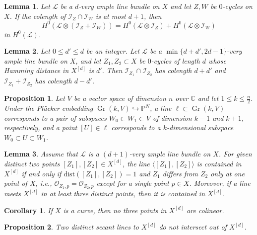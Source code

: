 \documentclass[10pt,a4paper]{amsart}
\newtheorem{lem}{Lemma}
\newtheorem{prop}{Proposition}
\newtheorem{cor}{Corollary}
\def \CC {\mathbb{C}}
\DeclareMathOperator{\Gr}{Gr}
\def \Ical {\mathcal{I}}
\def \Lcal {\mathcal{L}}
\def \Ocal {\mathcal{O}}
\def \PP {\mathbb{P}}
\begin{document}
\begin{lem} \label{lem:sum-of-ideals}
    Let $\Lcal$ be a $d$-very ample line bundle on $X$ and let $Z,W$ be $0$-cycles on $X$.
    If the colength of $\Ical_Z \cap \Ical_W$ is at most $d+1$, then 
     \begin{equation}
        H^0(\Lcal \otimes (\Ical_{Z}+\Ical_{W})) = H^0(\Lcal \otimes \Ical_{Z}) + H^0(\Lcal \otimes \Ical_{W})
     \end{equation}
    in $H^0(\Lcal)$.
\end{lem}

\begin{lem} \label{lem:Hamming-distance-and-length}
    Let $0 \leq d' \leq d$ be an integer.
    Let $\Lcal$ be a $\min \{ d+d', 2d-1 \}$-very ample line bundle on $X$, and let $Z_1, Z_2 \subset X$ be $0$-cycles of length $d$ whose Hamming distance in $X^{[d]}$ is $d'$.
    Then $\Ical_{Z_1} \cap \Ical_{Z_2}$ has colength $d+d'$ and $\Ical_{Z_1} + \Ical_{Z_2}$ has colength $d-d'$.
\end{lem}

\begin{prop} \label{prop:lines-in-Grassmannian}
    Let $V$ be a vector space of dimension $n$ over $\CC$ and let $1 \leq k \leq \frac{n}{2}$.
    Under the Pl\"ucker embedding $\Gr(k,V) \hookrightarrow \PP^N$, a line $\ell \subset \Gr(k,V)$ corresponds to a pair of subspaces $W_0 \subset W_1 \subset V$ of dimension $k-1$ and $k+1$, respectively, and a point $[U] \in \ell$ corresponds to a $k$-dimensional subspace $W_0 \subset U \subset W_1$.
\end{prop}

\begin{lem} \label{lem:lines-in-Hilbert-scheme}
    Assume that $\Lcal$ is a $(d+1)$-very ample line bundle on $X$.
    For given distinct two points $[Z_1], [Z_2] \in X^{[d]}$, the line $\langle [Z_1],[Z_2] \rangle$ is contained in $X^{[d]}$ if and only if $\mathrm{dist}([Z_1],[Z_2]) = 1$ and $Z_1$ differs from $Z_2$ only at one point of $X$, i.e., $\Ocal_{Z_1, p} = \Ocal_{Z_2, p}$ except for a single point $p \in X$.
    Moreover, if a line meets $X^{[d]}$ in at least three distinct points, then it is contained in $X^{[d]}$.
\end{lem}

\begin{cor} \label{cor:No-lines-for-curve}
    If $X$ is a curve, then no three points in $X^{[d]}$ are colinear.
\end{cor}

\begin{prop} \label{prop:Secant-lines-intersect}
    Two distinct secant lines to $X^{[d]}$ do not intersect out of $X^{[d]}$.
\end{prop}
\end{document}
